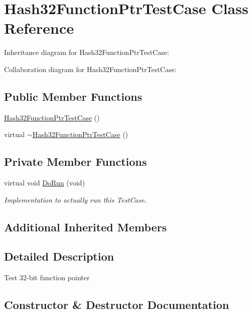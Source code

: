 \hypertarget{classHash32FunctionPtrTestCase}{}\section{Hash32\+Function\+Ptr\+Test\+Case Class Reference}
\label{classHash32FunctionPtrTestCase}


Inheritance diagram for Hash32\+Function\+Ptr\+Test\+Case\+:


Collaboration diagram for Hash32\+Function\+Ptr\+Test\+Case\+:
\subsection*{Public Member Functions}
\begin{DoxyCompactItemize}
\item 
\hyperlink{classHash32FunctionPtrTestCase_a6509ec204edf9eafc936c594657f42dd}{Hash32\+Function\+Ptr\+Test\+Case} ()
\item 
virtual \hyperlink{classHash32FunctionPtrTestCase_a741fbc3cf0bb38f4486412c51e85dfbb}{$\sim$\+Hash32\+Function\+Ptr\+Test\+Case} ()
\end{DoxyCompactItemize}
\subsection*{Private Member Functions}
\begin{DoxyCompactItemize}
\item 
virtual void \hyperlink{classHash32FunctionPtrTestCase_ad4a6c6e792b1a5cae85e12efa0b2f897}{Do\+Run} (void)
\begin{DoxyCompactList}\small\item\em Implementation to actually run this Test\+Case. \end{DoxyCompactList}\end{DoxyCompactItemize}
\subsection*{Additional Inherited Members}


\subsection{Detailed Description}
Test 32-\/bit function pointer 

\subsection{Constructor \& Destructor Documentation}
